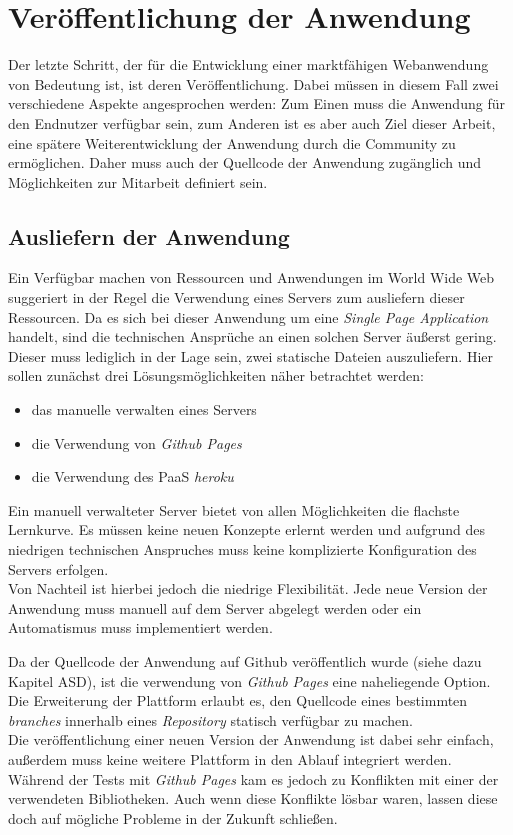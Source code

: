 \chapter{Veröffentlichung der Anwendung}
\thispagestyle{fancy}

Der letzte Schritt, der für die Entwicklung einer marktfähigen Webanwendung von Bedeutung ist, ist deren Veröffentlichung. Dabei müssen in diesem Fall zwei verschiedene Aspekte angesprochen werden: Zum Einen muss die Anwendung für den Endnutzer verfügbar sein, zum Anderen ist es aber auch Ziel dieser Arbeit, eine spätere Weiterentwicklung der Anwendung durch die Community zu ermöglichen. Daher muss auch der Quellcode der Anwendung zugänglich und Möglichkeiten zur Mitarbeit definiert sein.

\section{Ausliefern der Anwendung}
\label{chap:hosting}
Ein Verfügbar machen von Ressourcen und Anwendungen im World Wide Web suggeriert in der Regel die Verwendung eines Servers zum ausliefern dieser Ressourcen. Da es sich bei dieser Anwendung um eine \textit{Single Page Application} handelt, sind die technischen Ansprüche an einen solchen Server äußerst gering. Dieser muss lediglich in der Lage sein, zwei statische Dateien auszuliefern.
Hier sollen zunächst drei Lösungsmöglichkeiten näher betrachtet werden:

\begin{itemize}
  \item das manuelle verwalten eines Servers
  \item die Verwendung von \textit{Github Pages}
  \item die Verwendung des PaaS \textit{heroku}
\end{itemize}

Ein manuell verwalteter Server bietet von allen Möglichkeiten die flachste Lernkurve. Es müssen keine neuen Konzepte erlernt werden und aufgrund des niedrigen technischen Anspruches muss keine komplizierte Konfiguration des Servers erfolgen.\\
Von Nachteil ist hierbei jedoch die niedrige Flexibilität. Jede neue Version der Anwendung muss manuell auf dem Server abgelegt werden oder ein Automatismus muss implementiert werden.

Da der Quellcode der Anwendung auf Github veröffentlich wurde (siehe dazu Kapitel ASD), ist die verwendung von \textit{Github Pages} eine naheliegende Option. Die Erweiterung der Plattform erlaubt es, den Quellcode eines bestimmten \textit{branches} innerhalb eines \textit{Repository} statisch verfügbar zu machen.\\
Die veröffentlichung einer neuen Version der Anwendung ist dabei sehr einfach, außerdem muss keine weitere Plattform in den Ablauf integriert werden. Während der Tests mit \textit{Github Pages} kam es jedoch zu Konflikten mit einer der verwendeten Bibliotheken. Auch wenn diese Konflikte lösbar waren, lassen diese doch auf mögliche Probleme in der Zukunft schließen.

